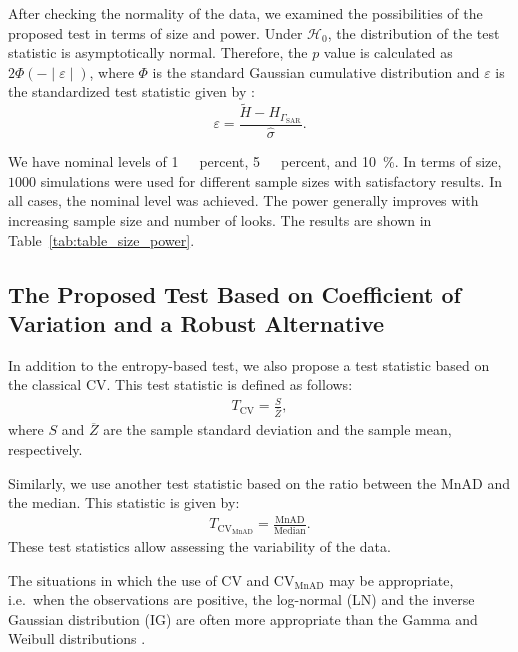 \documentclass[remotesensing,article,submit,moreauthors,pdftex]{Definitions/mdpi}
\begin{document}
After checking the normality of the data, we examined the possibilities of the proposed test in terms of size and power.
Under \(\mathcal{H}_0\), the distribution of the test statistic is asymptotically normal.
Therefore, the \(p\) value is calculated as
\(2\Phi(-\mid \varepsilon\mid)\), where \(\Phi\) is the standard
Gaussian cumulative distribution and \(\varepsilon\) is the standardized test statistic given by :
\[
\varepsilon=\frac{\tilde{H}-H_{\Gamma_{\text{SAR}}}}{\hat\sigma}.
\]

We have nominal levels of \SI{1}{\ percent}, \SI{5}{\ percent}, and
\SI{10}{\percent}. 
In terms of size, \(1000\) simulations were used for different sample sizes with satisfactory results. 
In all cases, the nominal level was achieved. 
The power generally improves with increasing sample size and number of looks.
The results are shown in Table~\ref{tab:table_size_power}.

\hypertarget{the-proposed-test-based-on-coefficient-of-variation-and-a-robust-alternative}{%
\subsection{The Proposed Test Based on Coefficient of Variation and a
Robust
Alternative}\label{the-proposed-test-based-on-coefficient-of-variation-and-a-robust-alternative}}

In addition to the entropy-based test, we also propose a test statistic
based on the classical CV. 
This test statistic is defined as follows:
\begin{align}
    T_{\text{CV}}=\frac{S}{\overline{Z}},
\end{align} 
where \(S\) and \(\overline{Z}\) are the sample standard deviation and the sample mean, respectively.

Similarly, we use another test statistic based on the ratio between the MnAD and the median.
This statistic is given by:
\begin{align}
    T_{\text{CV}_{\text{MnAD}}}=\frac{\text{MnAD}}{\text{Median}}.
\end{align} These test statistics allow assessing the variability of the
data.

The situations in which the use of CV and \(\text{CV}_{\text{MnAD}}\) may be appropriate, i.e.~when the observations are positive, the log-normal
(LN) and the inverse Gaussian distribution (IG) are often more appropriate than the Gamma and Weibull distributions
\cite{Chaubey2017,takagi1997application}.
\end{document}
